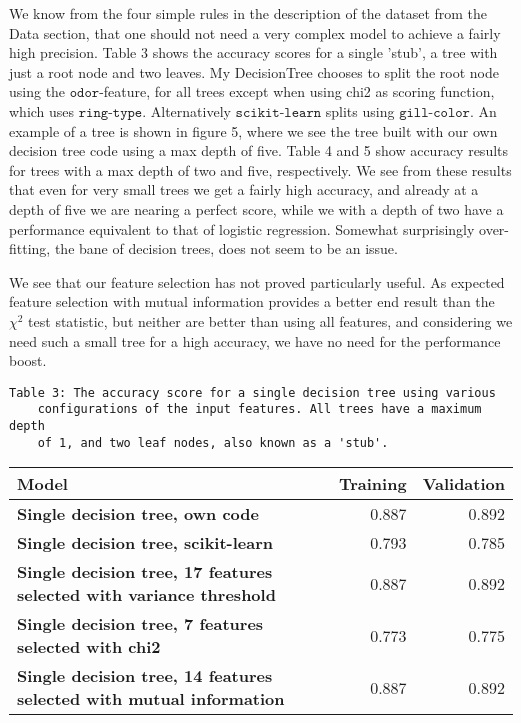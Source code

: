 \documentclass[11pt]{article}
\begin{document}
 We know from the four simple rules in the description of the dataset from the Data section, that one should not need a very complex model to achieve a fairly high precision. Table 3 shows the accuracy scores for a single 'stub', a tree with just a root node and two leaves. My DecisionTree chooses to split the root node using the $\texttt{odor}$-feature, for all trees except when using chi2 as scoring function, which uses $\texttt{ring-type}$. Alternatively $\texttt{scikit-learn}$ splits using $\texttt{gill-color}$. An example of a tree is shown in figure 5, where we see the tree built with our own decision tree code using a max depth of five. Table 4 and 5 show accuracy results for trees with a max depth of two and five, respectively. We see from these results that even for very small trees we get a fairly high accuracy, and already at a depth of five we are nearing a perfect score, while we with a depth of two have a performance equivalent to that of logistic regression. Somewhat surprisingly over-fitting, the bane of decision trees, does not seem to be an issue.

We see that our feature selection has not proved particularly useful. As expected feature selection with mutual information provides a better end result than the \(\chi^2\) test statistic, but neither are better than using all features, and considering we need such a small tree for a high accuracy, we have no need for the performance boost.
\newpage
\begin{Verbatim}[commandchars=\\\{\}]
	Table 3: The accuracy score for a single decision tree using various 
	configurations of the input features. All trees have a maximum depth 
	of 1, and two leaf nodes, also known as a 'stub'.
\end{Verbatim}

\begin{table}[h!]
	\begin{center}
		\label{tab:table1}
		\begin{tabular}{l|r|r}
        \textbf{Model}                                                      		   & \textbf{Training} & \textbf{Validation}
        \\ \hline
		\textbf{Single decision tree, own code}                                        & 0.887             & 0.892               \\ \hline
		\textbf{Single decision tree, scikit-learn}                                    & 0.793             & 0.785               \\ \hline
		\textbf{Single decision tree, 17 features selected with variance threshold}    & 0.887             & 0.892               \\ \hline
		\textbf{Single decision tree, 7 features selected with chi2}                   & 0.773             & 0.775               \\ \hline
		\textbf{Single decision tree, 14 features selected with mutual information}    & 0.887             & 0.892               \\ \hline
		\end{tabular}
	\end{center}
\end{table}
\end{document}

